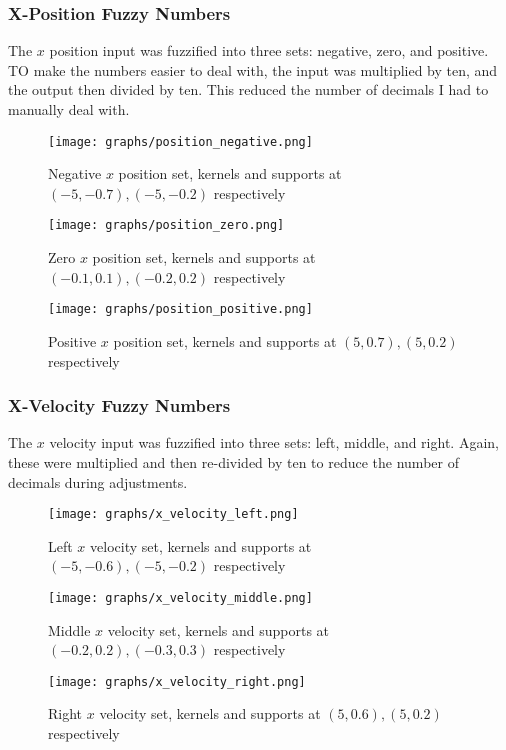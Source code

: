\documentclass[12pt, article]{scrartcl}
\begin{document}
\subsubsection{X-Position Fuzzy Numbers}
The $x$ position input was fuzzified into three sets: negative, zero, and positive. TO make the numbers easier to deal with, the input was multiplied by ten, and the output then divided by ten. This reduced the number of decimals I had to manually deal with.
\begin{figure}[h]
    \caption{Negative $x$ position set, kernels and supports at $(-5, -0.7), (-5, -0.2)$ respectively}
    \texttt{[image: graphs/position\_negative.png]}
\end{figure}
\begin{figure}[h]
    \caption{Zero $x$ position set, kernels and supports at $(-0.1, 0.1), (-0.2, 0.2)$ respectively}
    \texttt{[image: graphs/position\_zero.png]}
\end{figure}
\begin{figure}[h]
    \caption{Positive $x$ position set, kernels and supports at $(5, 0.7), (5, 0.2)$ respectively}
    \texttt{[image: graphs/position\_positive.png]}
\end{figure}

\subsubsection{X-Velocity Fuzzy Numbers}
The $x$ velocity input was fuzzified into three sets: left, middle, and right. Again, these were multiplied and then re-divided by ten to reduce the number of decimals during adjustments.
\begin{figure}[h]
    \caption{Left $x$ velocity set, kernels and supports at $(-5, -0.6), (-5, -0.2)$ respectively}
    \texttt{[image: graphs/x\_velocity\_left.png]}
\end{figure}
\begin{figure}[h]
    \caption{Middle $x$ velocity set, kernels and supports at $(-0.2, 0.2), (-0.3, 0.3)$ respectively}
    \texttt{[image: graphs/x\_velocity\_middle.png]}
\end{figure}
\begin{figure}[h]
    \caption{Right $x$ velocity set, kernels and supports at $(5, 0.6), (5, 0.2)$ respectively}
    \texttt{[image: graphs/x\_velocity\_right.png]}
\end{figure}
\end{document}
